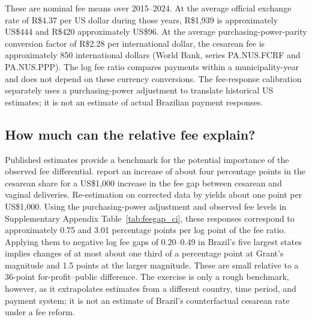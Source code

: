 \documentclass[12pt]{article}
\newcommand{\satab}[1]{Supplementary Appendix Table~\ref{#1}}
\begin{document}
These are nominal fee means over 2015–2024. At the average official exchange rate of R\$4.37 per US dollar during those years, R\$1,939 is approximately US\$444 and R\$420 approximately US\$96. At the average purchasing-power-parity conversion factor of R\$2.28 per international dollar, the cesarean fee is approximately 850 international dollars (World Bank, series PA.NUS.FCRF and PA.NUS.PPP). The log fee ratio compares payments within a municipality-year and does not depend on these currency conversions. The fee-response calibration separately uses a purchasing-power adjustment to translate historical US estimates; it is not an estimate of actual Brazilian payment responses.

\subsection{How much can the relative fee explain?}

Published estimates provide a benchmark for the potential importance of the observed fee differential. \citet{gruber1999physician} report an increase of about four percentage points in the cesarean share for a US\$1,000 increase in the fee gap between cesarean and vaginal deliveries. Re-estimation on corrected data by \citet{grant2009} yields about one point per US\$1,000. Using the purchasing-power adjustment and observed fee levels in \satab{tab:feegap_ci}, these responses correspond to approximately 0.75 and 3.01 percentage points per log point of the fee ratio. Applying them to negative log fee gaps of 0.20–0.49 in Brazil's five largest states implies changes of at most about one third of a percentage point at Grant's magnitude and 1.5 points at the larger \citet{gruber1999physician} magnitude. These are small relative to a 36-point for-profit–public difference. The exercise is only a rough benchmark, however, as it extrapolates estimates from a different country, time period, and payment system; it is not an estimate of Brazil's counterfactual cesarean rate under a fee reform.
\end{document}
